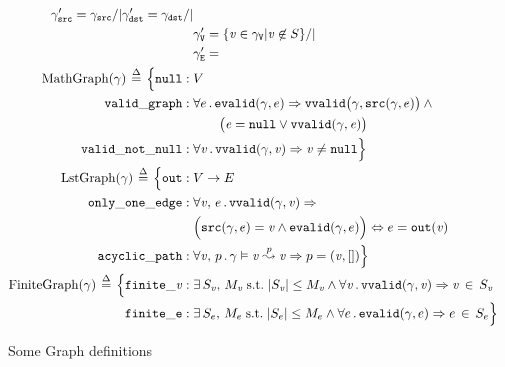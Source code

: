 \begin{figure}
\begin{gather*}
\begin{aligned}
       	 	\gamma'_{\mathtt{src}} = \gamma_{\mathtt{src}}/|
       	 	\gamma'_{\mathtt{dst}} = \gamma_{\mathtt{dst}}/| \null \\
       	 	&\gamma'_{\mathtt{V}} = \{\m{v} \in \gamma_{\mathtt{V}} | \m{v} \not\in S\} /| \null \\ 
       	 	&\gamma'_{\mathtt{E}} = \\
        \mathrm{MathGraph}(\gamma)\,\defeq\,\Big\{
          \mathtt{null}:\; & V\\ 
          \mathtt{valid\_graph}:\;& \forall e\,.\,\mathtt{evalid}(\gamma, e) \Rightarrow
          \mathtt{vvalid}\big(\gamma, \mathtt{src}(\gamma, e)\big)\wedge \null \\
          & \qquad \big(\m{e} = \mathtt{null} \vee \mathtt{vvalid}(\gamma, \m{e})\big)\\
          \mathtt{valid\_not\_null}:\;& \forall \m{v}\,.\,\mathtt{vvalid}(\gamma, \m{v})
          \Rightarrow \m{v} \neq \mathtt{null} \Big\} \\
        \mathrm{LstGraph}(\gamma)\,\defeq\, \Big\{
          \mathtt{out}:\; & V \rightarrow E\\
          \mathtt{only\_one\_edge}:\; & \forall \m{v},\,e\,.\,
          \mathtt{vvalid}(\gamma, \m{v}) \Rightarrow \\
          & \Big(\mathtt{src}(\gamma, e) =\m{v} \wedge
          \mathtt{evalid}(\gamma, e)\Big) \Leftrightarrow
          e = \mathtt{out}(\m{v})\\
         \mathtt{acyclic\_path}:\; & \forall \m{v},\,p\,.\,
         \gamma \vDash \m{v} \overset{p}{\leadsto} \m{v} \Rightarrow p = (\m{v},[])\Big\} \\
       	\mathrm{FiniteGraph}(\gamma)\,\defeq\, \Big\{
          \mathtt{finite\_\m{v}}:\;&\exists\, S_\m{v},\, M_\m{v}\;\text{s.t.}\;\lvert S_\m{v}\rvert
          \leq M_\m{v} \wedge
          \forall \m{v}\,.\, \mathtt{vvalid}(\gamma,\m{v})\Rightarrow \m{v}\,\in\,S_\m{v}\\
          \mathtt{finite\_e}:\;&\exists\, S_e,\, M_e\;\text{s.t.}\;\lvert S_e\rvert
          \leq M_e \wedge
          \forall e\,.\, \mathtt{evalid}(\gamma,e)\Rightarrow e\,\in\,S_e \Big\}
    	\end{aligned}
    \end{gather*}
\caption{Some Graph definitions}
\label{fig:graphdefns}
\vspace{-1em}
\end{figure}